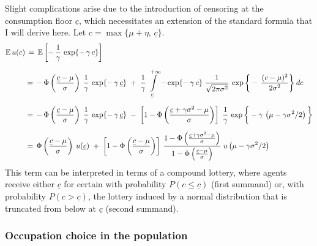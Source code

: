 Slight complications arise due to the introduction of censoring at the consumption floor $\underline{c}$, which necessitates an extension of the standard formula that I will derive here. Let $c = \max\{\mu + \eta, \, \underline{c}\}$.
\begin{align}
\mathbb{E} \,  u(c) & \, = \,  \mathbb{E}\left[- \, \frac{1}{\gamma} \,\exp\{- \,  \gamma \, c  \} \right]  \\[6pt]
& = \, -  \, \Phi\left(\frac{\underline{c} - \mu}{\sigma}\right) \: \frac{1}{\gamma} \,  \exp\{- \,  \gamma \, \underline{c}  \}   \; + \; \frac{1}{\gamma} \, 
\int\displaylimits_{\underline{c}}^{+ \infty} - \exp\{- \,  \gamma \, c  \} \; \frac{1}{\sqrt{2 \pi \sigma^2}} \: \exp\bigg\{- \, \frac{(c - \mu)^2}{2 \sigma^2} \bigg\} \: dc \\[6pt]
& = \, -  \, \Phi\left(\frac{\underline{c} - \mu}{\sigma}\right) \: \frac{1}{\gamma} \, \exp\{- \,  \gamma \, \underline{c}  \}   \; -  \; 
 \left[1 - \Phi\left(\frac{\underline{c} + \gamma \sigma^2 - \mu}{\sigma}\right) \right] \;  \frac{1}{\gamma} \, \exp\bigg\{- \gamma \, \left(\mu -  \gamma \sigma^2 /2 \right) \bigg\} \\[6pt]
& = \, \Phi\left(\frac{\underline{c} - \mu}{\sigma}\right) \: u(\underline{c})   \; +  \; \left[1 - \Phi\left(\frac{\underline{c} - \mu}{\sigma}\right) \right] \: \frac{1 - \Phi\left(\frac{\underline{c} + \gamma \sigma^2 - \mu}{\sigma}\right)}{1 - \Phi\left(\frac{\underline{c} - \mu}{\sigma}\right)} \; u\left(\mu -  \gamma \sigma^2 /2 \right)
\end{align}
This term can be interpreted in terms of a compound lottery, where agents receive either $\underline{c}$ for certain with probability $P(c \leq \underline{c})$ (first summand) or, with probability $P(c > \underline{c})$, the lottery induced by a normal distribution that is truncated from below at $\underline{c}$ (second summand). 



\subsubsection*{Occupation choice in the population}

